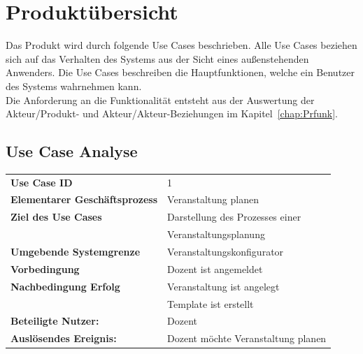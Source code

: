 		
		
	\section{Produktübersicht}
	
	Das Produkt wird durch folgende Use Cases beschrieben. Alle Use Cases beziehen sich auf das Verhalten des Systems aus der Sicht eines außenstehenden Anwenders. Die Use Cases beschreiben die Hauptfunktionen, welche ein Benutzer des Systems wahrnehmen kann.\\
	Die Anforderung an die Funktionalität entsteht aus der Auswertung der Akteur/Produkt- und Akteur/Akteur-Beziehungen im Kapitel~\ref{chap:Prfunk}.
	
	\subsection{Use Case Analyse}
	
	\begin{table}[H]
	\begin{tabular}{|ll}
	 \rowcolor{hellgrau}\textbf{Use Case ID} & 1 \\
 	 \textbf{Elementarer Geschäftsprozess} &  Veranstaltung planen \\ 
	 \textbf{Ziel des Use Cases} & Darstellung des  Prozesses einer    \\
	 & Veranstaltungsplanung\\ 
	 \textbf{Umgebende Systemgrenze}& Veranstaltungskonfigurator \\ 
	 \textbf{Vorbedingung} & Dozent ist angemeldet \\ 
	 \textbf{Nachbedingung Erfolg} & Veranstaltung ist angelegt \\ 
	 & Template ist erstellt\\
	 \textbf{Beteiligte Nutzer:} & Dozent \\ 
     \textbf{Auslösendes Ereignis:} & Dozent möchte Veranstaltung planen \\ 
	 
	\end{tabular} 
	\label{tab:usecase_1}
	\end{table}
	
